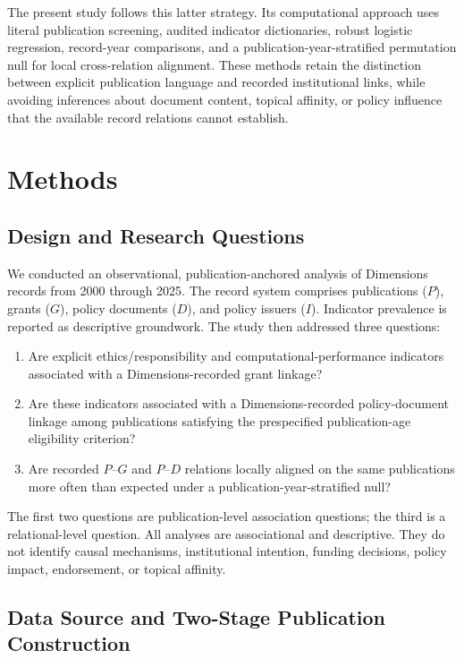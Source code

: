 \documentclass[12pt]{article}
\begin{document}
The present study follows this latter strategy. Its computational approach uses literal publication screening, audited indicator dictionaries, robust logistic regression, record-year comparisons, and a publication-year-stratified permutation null for local cross-relation alignment. These methods retain the distinction between explicit publication language and recorded institutional links, while avoiding inferences about document content, topical affinity, or policy influence that the available record relations cannot establish.

\section{Methods}

\subsection{Design and Research Questions}

We conducted an observational, publication-anchored analysis of Dimensions records from 2000 through 2025. The record system comprises publications ($P$), grants ($G$), policy documents ($D$), and policy issuers ($I$). Indicator prevalence is reported as descriptive groundwork. The study then addressed three questions:

\begin{enumerate}
    \item Are explicit ethics/responsibility and computational-performance indicators associated with a Dimensions-recorded grant linkage?
    \item Are these indicators associated with a Dimensions-recorded policy-document linkage among publications satisfying the prespecified publication-age eligibility criterion?
    \item Are recorded $P$--$G$ and $P$--$D$ relations locally aligned on the same publications more often than expected under a publication-year-stratified null?
\end{enumerate}

The first two questions are publication-level association questions; the third is a relational-level question. All analyses are associational and descriptive. They do not identify causal mechanisms, institutional intention, funding decisions, policy impact, endorsement, or topical affinity.

\subsection{Data Source and Two-Stage Publication Construction}
\end{document}
